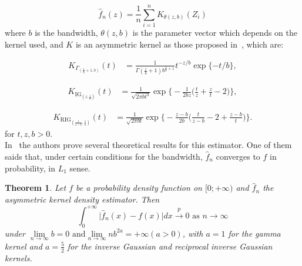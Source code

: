 \documentclass[journal]{IEEEtran}
\numberwithin{equation}{section}
\newtheorem{theorem}{Theorem}[section]
\begin{document}
\begin{equation}
\widehat{f}_n(z)=\frac{1}{n}\sum_{i=1}^n K_{\theta(z,b)}(Z_i)
\label{fn}
\end{equation}
where  $b$ is the bandwidth, ${\theta}(z,b)$ is the parameter vector which depends on the kernel used, and $K$ is an asymmetric kernel  as those proposed in~\cite{bouezmarni2005}, which are: 

\begin{align}
K_{\Gamma_{\left(\frac{z}{b}+1,b\right)}}(t) & =\frac{1}{\Gamma(\frac{z}{b}+1)b^{\frac{z}{b}+1}} t^{-{z}/{b}} \exp\{-{t}/{b}\},
\label{gammakernel}
\end{align}

\begin{align}
K_{\text{IG}_{\left( z;\frac{1}{b}\right)}}(t) & =\frac{1}{\sqrt{2\pi b t^3}} 
\exp\Big\{-\frac{1}{2b z} \Big(\frac{t}{z}+\frac{z}{t}-2\Big)\Big\},
\label{IGkernel}
\end{align}

\begin{align}
K_{\text{RIG}_{\left(\frac{1}{z-b},\frac{1}{b}\right)}}(t) & =\frac{1}{\sqrt{2\pi b t}} 
\exp\Big\{-\frac{z-b}{2b} \Big(\frac{t}{z-b}-2+\frac{z-b}{t}\Big)\Big\}.
\label{RIGkernel}
\end{align}
for $t,z,b>0$.\\

In~\cite{bouezmarni2005} the authors prove several theoretical results for this estimator. One of them saids that,  under certain conditions for the bandwidth, $\widehat{f}_n$ converges to $f$  in probability, in $L_1$ sense.
\vspace{0.2cm}

\begin{theorem}
	Let $f$ be a probability density function on $[0;+\infty)$ and $\widehat{f}_n$ the asymmetric kernel density estimator. Then
	\begin{equation}
	\int_0^{+\infty} \vert \widehat{f}_n(x)-f(x)\vert dx \stackrel{p} {\longrightarrow} 0 \text{ as } n \longrightarrow \infty
	\label{L1}
	\end{equation}
	under $\lim\limits_{n \to \infty} b = 0 \text{ and} \lim\limits_{n \to \infty} n b^{2a} = +\infty (a > 0)$, with $a = 1$ for the gamma kernel and $a = \frac{5}{2}$ for the
	inverse Gaussian and reciprocal inverse Gaussian kernels.
\end{theorem}
\end{document}
